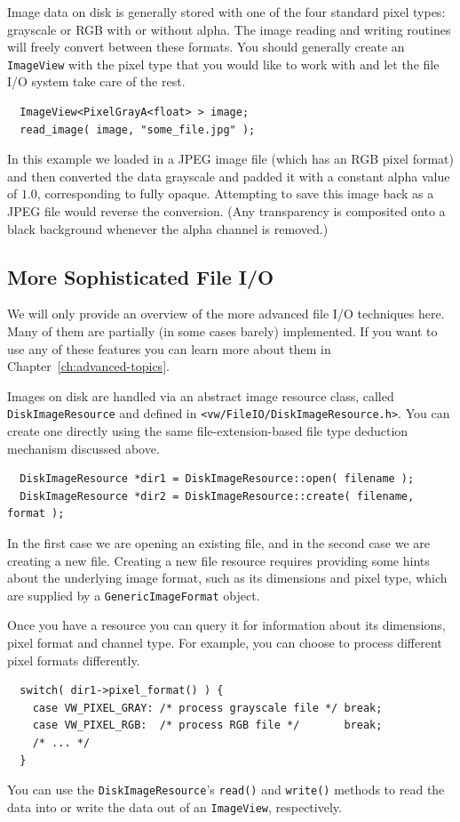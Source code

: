 Image data on disk is generally stored with one of the four standard
pixel types: grayscale or RGB with or without alpha.  The image
reading and writing routines will freely convert between these
formats.  You should generally create an \verb#ImageView# with the
pixel type that you would like to work with and let the file I/O
system take care of the rest.
\begin{verbatim}
  ImageView<PixelGrayA<float> > image;
  read_image( image, "some_file.jpg" );
\end{verbatim}
In this example we loaded in a JPEG image file (which has an RGB pixel
format) and then converted the data grayscale and padded it with a
constant alpha value of $1.0$, corresponding to fully opaque.  
Attempting to save this image back as a JPEG file would reverse the 
conversion.  (Any transparency is composited onto a black background 
whenever the alpha channel is removed.)

\subsection{More Sophisticated File I/O}

We will only provide an overview of the more advanced file I/O 
techniques here.  Many of them are partially (in some cases barely) 
implemented.  If you want to use any of these features you can 
learn more about them in Chapter~\ref{ch:advanced-topics}.

Images on disk are handled via an abstract image resource
class, called \verb#DiskImageResource# and defined in
\verb#<vw/FileIO/DiskImageResource.h>#.  You can create one directly 
using the same file-extension-based file type deduction mechanism 
discussed above.
\begin{verbatim}
  DiskImageResource *dir1 = DiskImageResource::open( filename );
  DiskImageResource *dir2 = DiskImageResource::create( filename, format );
\end{verbatim}
In the first case we are opening an existing file, and in the second 
case we are creating a new file.  Creating a new file resource requires 
providing some hints about the underlying image format, such as its 
dimensions and pixel type, which are supplied by a \verb#GenericImageFormat# 
object.

Once you have a resource you can query it for information about its 
dimensions, pixel format and channel type.  For example, you can choose 
to process different pixel formats differently.
\begin{verbatim}
  switch( dir1->pixel_format() ) {
    case VW_PIXEL_GRAY: /* process grayscale file */ break;
    case VW_PIXEL_RGB:  /* process RGB file */       break;
    /* ... */
  }
\end{verbatim}
You can use the \verb#DiskImageResource#'s \verb#read()# and \verb#write()# 
methods to read the data into or write the data out of an \verb#ImageView#, 
respectively.

